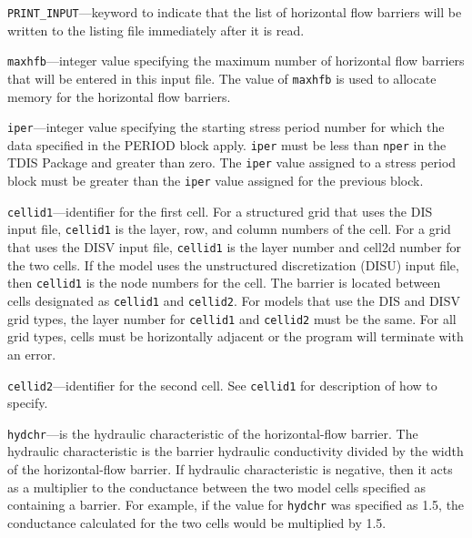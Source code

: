 
\item \texttt{PRINT\_INPUT}---keyword to indicate that the list of horizontal flow barriers will be written to the listing file immediately after it is read.

\item \texttt{maxhfb}---integer value specifying the maximum number of horizontal flow barriers that will be entered in this input file.  The value of \texttt{maxhfb} is used to allocate memory for the horizontal flow barriers.

\item \texttt{iper}---integer value specifying the starting stress period number for which the data specified in the PERIOD block apply.  \texttt{iper} must be less than \texttt{nper} in the TDIS Package and greater than zero.  The \texttt{iper} value assigned to a stress period block must be greater than the \texttt{iper} value assigned for the previous block.

\item \texttt{cellid1}---identifier for the first cell.  For a structured grid that uses the DIS input file, \texttt{cellid1} is the layer, row, and column numbers of the cell.   For a grid that uses the DISV input file, \texttt{cellid1} is the layer number and cell2d number for the two cells.  If the model uses the unstructured discretization (DISU) input file, then \texttt{cellid1} is the node numbers for the cell.  The barrier is located between cells designated as \texttt{cellid1} and \texttt{cellid2}.  For models that use the DIS and DISV grid types, the layer number for \texttt{cellid1} and \texttt{cellid2} must be the same.  For all grid types, cells must be horizontally adjacent or the program will terminate with an error.

\item \texttt{cellid2}---identifier for the second cell. See \texttt{cellid1} for description of how to specify.

\item \texttt{hydchr}---is the hydraulic characteristic of the horizontal-flow barrier. The hydraulic characteristic is the barrier hydraulic conductivity divided by the width of the horizontal-flow barrier. If hydraulic characteristic is negative, then it acts as a multiplier to the conductance between the two model cells specified as containing a barrier. For example, if the value for \texttt{hydchr} was specified as 1.5, the conductance calculated for the two cells would be multiplied by 1.5.


